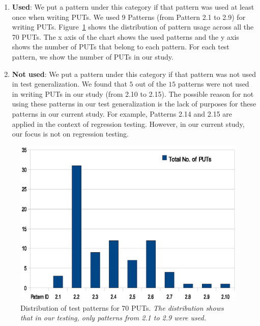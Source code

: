 \begin{enumerate}
\item \textbf{Used}: We put a pattern under this category if that
pattern was used at least once when writing PUTs.
We used 9 Patterns (from Pattern 2.1 to 2.9) for writing PUTs. Figure~\ref{fig:patterndistribution} shows the 
distribution of pattern usage across all the 70 PUTs. The x axis of the 
chart shows the used patterns and the y axis shows the number of PUTs that belong to each pattern.
For each test pattern, we show the number of PUTs in our study. 

\item \textbf{Not used}: We put a pattern under this category if that 
pattern was not used in test generalization. We found that $5$ 
out of the $15$ patterns were not used in writing PUTs in our study  
(from 2.10 to 2.15). The possible reason for not using these patterns 
in our test generalization is the lack of purposes for these patterns 
in our current study. For example, Patterns 2.14 and 2.15 are applied 
in the context of regression testing. However, in our current study, our
focus is not on regression testing. 
\end{enumerate}

\begin{figure}[t]
\centering
\includegraphics[scale=0.55,clip,trim=180 180 150 100]{figs/patterndistributionSeparated.eps}
\caption{\label{fig:patterndistribution}Distribution of test patterns for 70 PUTs. \textit{The distribution shows that in our testing, only patterns from 2.1 to 2.9 were used.}}
\end{figure}
